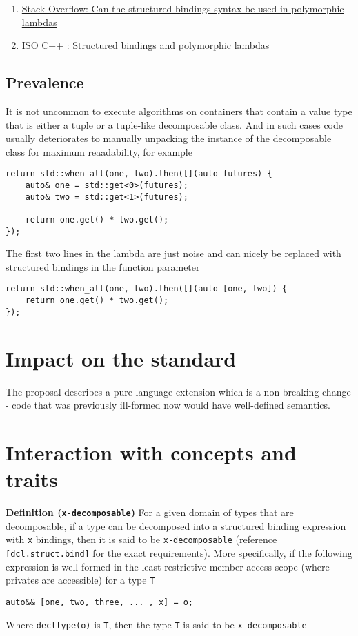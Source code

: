 \documentclass{article}
\begin{document}
\begin{enumerate}
    \item \href{https://stackoverflow.com/questions/45541334}{Stack Overflow:
        Can the structured bindings syntax be used in polymorphic lambdas}
    \item \href{https://goo.gl/fRSwNg}{ISO C++ : Structured bindings and
        polymorphic lambdas}
\end{enumerate}

\subsection{Prevalence}
It is not uncommon to execute algorithms on containers that contain a value
type that is either a tuple or a tuple-like decomposable class.  And in such
cases code usually deteriorates to manually unpacking the instance of the
decomposable class for maximum reaadability, for example

\begin{lstlisting}
return std::when_all(one, two).then([](auto futures) {
    auto& one = std::get<0>(futures);
    auto& two = std::get<1>(futures);

    return one.get() * two.get();
});
\end{lstlisting}

The first two lines in the lambda are just noise and can nicely be replaced
with structured bindings in the function parameter

\begin{lstlisting}
return std::when_all(one, two).then([](auto [one, two]) {
    return one.get() * two.get();
});
\end{lstlisting}


\section{Impact on the standard}
The proposal describes a pure language extension which is a non-breaking
change - code that was previously ill-formed now would have well-defined
semantics.


\section{Interaction with concepts and traits}
\textbf{Definition (\texttt{x-decomposable})} For a given domain of types that
are decomposable, if a type can be decomposed into a structured binding
expression with \texttt{x} bindings, then it is said to be
\texttt{x-decomposable} (reference \texttt{[dcl.struct.bind]} for the exact
requirements).  More specifically, if the following expression is well formed
in the least restrictive member access scope (where privates are accessible)
for a type \texttt{T}
\begin{lstlisting}
auto&& [one, two, three, ... , x] = o;
\end{lstlisting}
Where \texttt{decltype(o)} is \texttt{T}, then the type \texttt{T} is said to
be \texttt{x-decomposable}
\end{document}
